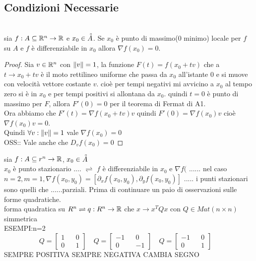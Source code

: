 \subsection{Condizioni Necessarie}
\\
sia $f:A\subseteq \mathbb{R}^n\rightarrow \mathbb{R}$ e $x_0\in\accentset{\circ}{A}$. Se $x_0$ è punto di massimo(0 minimo) locale per $f$ su $A$ e $f$ è differenziabile in $x_0$ allora $\nabla f(x_0)=0$.
\begin{proof}
	Sia $v\in \mathbb{R}^n$ con $\left\|v\right\| =1$, la funzione $F(t)= f(x_0+tv)$ che a $t\rightarrow x_0+tv$ è il moto rettilineo uniforme che passa da $x_0$ all'istante $0$ e si muove con velocità vettore costante $v$. cioè per tempi negativi mi avvicino a $x_0$ al tempo zero si è in $x_0$ e per tempi positivi si allontana da $x_0$. quindi $t=0$ è punto di massimo per $F$, allora $F'(0) = 0$ per il teorema di Fermat di A1.\\
	Ora abbiamo che $F'(t)=\nabla f(x_0+tv)v$ quindi $F'(0)=\nabla f(x_0)v$ cioè $\nabla f(x_0)v=0$.\\
	Quindi $\forall v :\left\|v\right\| =1$ vale $\nabla f(x_0)=0$\\
	OSS:: Vale anche che $D_vf(x_0)=0$
\end{proof}
sia $f:A\subseteq r^n\rightarrow \mathbb{R}$, $x_0\in\accentset{\circ}{A}$\\
$x_0$ è punto stazionario .... $\rightleftharpoons$ $f$ è differenziabile in $x_0$ e $\nabla f($ ......
\observation
nel caso $n=2, m=1, \nabla f(x_0,y_0)=[\partial_xf(x_0,y_0), \partial_yf(x_0,y_0)]$ ..... i punti stazionari sono quelli che ......parziali.
\observation
Prima di continuare un paio di osservazioni sulle forme quadratiche.\\
forma quadratica su $R^n \rightleftharpoons q:R^n\rightarrow \mathbb{R}$ che $x\rightarrow x^TQx$ con $Q\in Mat(n\times n)$ simmetrica\\
ESEMPI:n=2\\
$$
Q=\begin{bmatrix}1&&0\\0&&1\end{bmatrix}\quad
Q=\begin{bmatrix}-1&&0\\0&&-1\end{bmatrix}\quad
Q=\begin{bmatrix}-1&&0\\0&&1\end{bmatrix}\quad 
$$
SEMPRE POSITIVA SEMPRE NEGATIVA CAMBIA SEGNO\\
